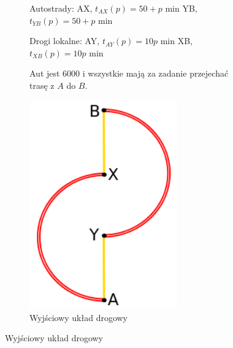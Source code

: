 \documentclass[twoside,12pt]{report}
\begin{document}
\vspace*{15px}
\begin{figure}[h]
\begin{flushleft}
\begin{subfigure}{.50\textwidth}
Autostrady:\newline
AX, $t_{AX}(p) =  50 + p$ min\newline
YB, $t_{YB}(p) =  50 + p$ min\newline

\vspace*{15px}
Drogi lokalne:\newline
AY, $t_{AY}(p) =  10p$ min\newline
XB, $t_{XB}(p) =  10p$ min\newline

\vspace*{15px}
Aut jest 6000 i wszystkie mają za zadanie przejechać trasę z $A$ do $B$.
\end{subfigure}%
\end{flushleft}
\begin{flushright}
	\begin{subfigure}{.50\textwidth}
	\centering
	\includegraphics[width=0.7\textwidth]{img/braess1}
	\caption{Wyjściowy układ drogowy}
	\end{subfigure}
\end{flushright}
\end{figure}
\end{document}

